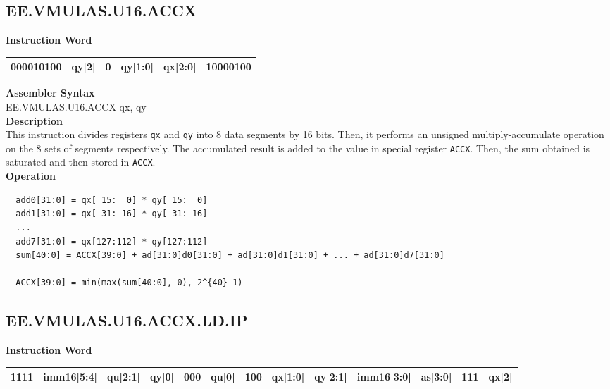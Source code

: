 \clearpage
\subsection{EE.VMULAS.U16.ACCX}\label{instruction:EEVMULASU16ACCX}
\setlength\tabcolsep{6pt}
\textbf{Instruction Word} \\
\begin{tabular}{|c|c|c|c|c|c|}
	\hline
	000010100 & qy[2] & 0 & qy[1:0] & qx[2:0] & 10000100 \\
	\hline
\end{tabular}

\textbf{Assembler Syntax} \\
EE.VMULAS.U16.ACCX qx, qy \\
\textbf{Description} \\
This instruction divides registers \lstinline{qx} and \lstinline{qy} into 8 data segments by 16 bits. Then, it performs an unsigned multiply-accumulate operation on the 8 sets of segments respectively. The accumulated result is added to the value in special register \lstinline{ACCX}. Then, the sum obtained is saturated and then stored in \lstinline{ACCX}.\\
\textbf{Operation}
\begin{lstlisting}
  add0[31:0] = qx[ 15:  0] * qy[ 15:  0]
  add1[31:0] = qx[ 31: 16] * qy[ 31: 16]
  ...
  add7[31:0] = qx[127:112] * qy[127:112]
  sum[40:0] = ACCX[39:0] + ad[31:0]d0[31:0] + ad[31:0]d1[31:0] + ... + ad[31:0]d7[31:0]

  ACCX[39:0] = min(max(sum[40:0], 0), 2^{40}-1)
\end{lstlisting}

\clearpage
\subsection{EE.VMULAS.U16.ACCX.LD.IP}\label{instruction:EEVMULASU16ACCXLDIP}
\setlength\tabcolsep{6pt}
\textbf{Instruction Word} \\
\begin{tabular}{|c|c|c|c|c|c|c|c|c|c|c|c|c|}
	\hline
	1111 & imm16[5:4] & qu[2:1] & qy[0] & 000 & qu[0] & 100 & qx[1:0] & qy[2:1] & imm16[3:0] & as[3:0] & 111 & qx[2] \\
	\hline
\end{tabular}

